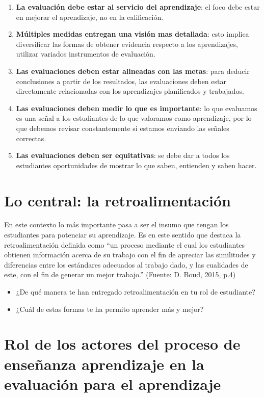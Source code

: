 \documentclass[12pt,letterpaper,article,x11names]{memoir}
\begin{document}
\begin{enumerate}
\item \textbf{La evaluación debe estar al servicio del aprendizaje}: el foco debe estar en mejorar el aprendizaje, no en la calificación.
\item \textbf{Múltiples medidas entregan una visión mas detallada}: esto implica diversificar las formas de obtener evidencia respecto a los aprendizajes, utilizar variados instrumentos de evaluación.
\item \textbf{Las evaluaciones deben estar alineadas con las metas}: para deducir conclusiones a partir de los resultados, las evaluaciones deben estar directamente relacionadas con los aprendizajes planificados y trabajados.
\item \textbf{Las evaluaciones deben medir lo que es importante}: lo que evaluamos es una señal a los estudiantes de lo que valoramos como aprendizaje, por lo que debemos revisar constantemente si estamos enviando las señales correctas.
\item \textbf{Las evaluaciones deben ser equitativas}: se debe dar a todos los estudiantes oportunidades de mostrar lo que saben, entienden y saben hacer.
\end{enumerate}
\section{Lo central: la retroalimentación}
\label{sec:orgf265531}
En este contexto lo más importante pasa a ser el insumo que tengan los estudiantes para potenciar su aprendizaje. Es en este sentido que destaca la retroalimentación definida como “un proceso mediante el cual los estudiantes obtienen información acerca de su trabajo con el fin de apreciar las similitudes y diferencias entre los estándares adecuados al trabajo dado, y las cualidades de este, con el fin de generar un mejor trabajo.” (Fuente: D. Boud, 2015, p.4)

\begin{itemize}
\item ¿De qué manera te han entregado retroalimentación en tu rol de estudiante?
\item ¿Cuál de estas formas te ha permito aprender más y mejor?
\end{itemize}

\section{Rol de los actores del proceso de enseñanza aprendizaje en la evaluación para el aprendizaje}
\label{sec:org516a715}
\end{document}
